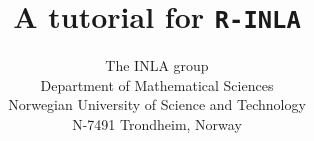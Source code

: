 \documentclass[a4paper, twoside, openright, chapterprefix, 11pt]{scrreprt}
\newcommand{\tv}{\texttt}
\begin{document}
\title{A tutorial for \tv{R-INLA}}
\author{The INLA group\\
 Department of Mathematical Sciences\\
 Norwegian University of Science and Technology\\
 N-7491 Trondheim, Norway}
\maketitle
{} 



\tableofcontents

\pagestyle{headings}















\appendix
 


\end{document}

